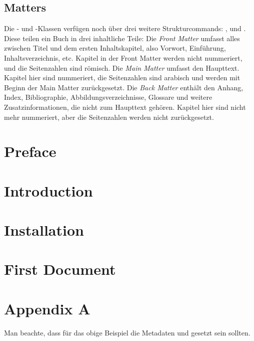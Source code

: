 \section{Matters}
Die - und -Klassen verfügen noch über drei weitere Strukturcommands: ,  und .
Diese teilen ein Buch in drei inhaltliche Teile:
Die \emph{Front Matter} umfasst alles zwischen Titel und dem ersten Inhaltskapitel, also Vorwort, Einführung, Inhaltsverzeichnis, etc.
Kapitel in der Front Matter werden nicht nummeriert, und die Seitenzahlen sind römisch.
Die \emph{Main Matter} umfasst den Haupttext.
Kapitel hier sind nummeriert, die Seitenzahlen sind arabisch und werden mit Beginn der Main Matter zurückgesetzt.
Die \emph{Back Matter} enthält den Anhang, Index, Bibliographie, Abbildungsverzeichnisse, Glossare und weitere Zusatzinformationen, die nicht zum Haupttext gehören.
Kapitel hier sind nicht mehr nummeriert, aber die Seitenzahlen werden nicht zurückgesetzt.
\begin{latexlisting}
	\maketitle
	\frontmatter
	\chapter{Preface}
	\blindtext[4]

	\clearpage
	\tableofcontents
	\clearpage

	\chapter{Introduction}
	\blindtext[2]

	\mainmatter

	\chapter{Installation}
	\blindtext[10]

	\chapter{First Document}
	\blindtext[10]

	\backmatter
	\chapter{Appendix A}
	\blindtext[5]
\end{latexlisting}
Man beachte, dass für das obige Beispiel die Metadaten  und  gesetzt sein sollten.

